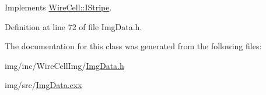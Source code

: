 Implements \hyperlink{class_wire_cell_1_1_i_stripe_aff1919f580099c2465c7d83dc9d7de18}{Wire\+Cell\+::\+I\+Stripe}.



Definition at line 72 of file Img\+Data.\+h.



The documentation for this class was generated from the following files\+:\begin{DoxyCompactItemize}
\item 
img/inc/\+Wire\+Cell\+Img/\hyperlink{_img_data_8h}{Img\+Data.\+h}\item 
img/src/\hyperlink{_img_data_8cxx}{Img\+Data.\+cxx}\end{DoxyCompactItemize}

